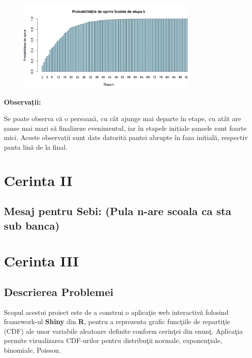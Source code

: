 \documentclass[a4paper,11pt]{article}
\begin{document}
\begin{figure}[h!]
    \centering
    \includegraphics[width=0.8\textwidth]{./img/3.png} %
    \label{fig:imaginea_ta_3}
\end{figure}
\newpage
\textbf{Observații:}

Se poate observa că o persoană, cu cât ajunge mai departe în etape, cu atât are șanse mai mari să finalizeze evenimentul, iar în etapele inițiale șansele sunt foarte mici. Aceste observații sunt date datorită pantei abrupte în faza inițială, respectiv panta lină de la final.

\newpage

\section*{Cerinta II}

\subsection*{Mesaj pentru Sebi: (Pula n-are scoala ca sta sub banca)}

\newpage

\section*{Cerinta III}

\subsection*{Descrierea Problemei}

Scopul acestui proiect este de a construi o aplica\c{t}ie web interactiv\u{a} folosind framework-ul \textbf{Shiny} din \textbf{R}, pentru a reprezenta grafic func\c{t}iile de reparti\c{t}ie (CDF) ale unor variabile aleatoare definite conform cerin\c{t}ei din enun\c{t}. Aplica\c{t}ia permite vizualizarea CDF-urilor pentru distribu\c{t}ii normale, exponen\c{t}iale, binomiale, Poisson.
\end{document}
